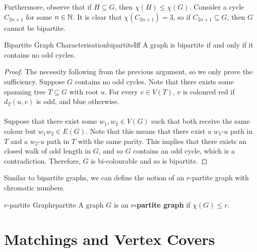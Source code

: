 \documentclass[math, code]{amznotes}
\theoremstyle{remark}
\begin{document}
Furthermore, observe that if $H \subseteq G$, then $\chi(H) \leq \chi(G)$. Consider a cycle $C_{2n + 1}$ for some $n \in \mathbb{N}$. It is clear that $\chi(C_{2n + 1}) = 3$, so if $C_{2n + 1} \subseteq G$, then $G$ cannot be bipartite.
\begin{thmbox}{Bipartite Graph Characterisation}{bipartiteIff}
    A graph is bipartite if and only if it contains no odd cycles.
    \tcblower
    \begin{proof}
        The necessity following from the previous argument, so we only prove the sufficiency. Suppose $G$ contains no odd cycles. Note that there exists some spanning tree $T \subseteq G$ with root $u$. For every $v \in V(T)$, $v$ is coloured red if $d_T(u, v)$ is odd, and blue otherwise.
        \\\\
        Suppose that there exist some $w_1, w_2 \in V(G)$ such that both receive the same colour but $w_1w_2 \in E(G)$. Note that this means that there exist a $w_1$-$u$ path in $T$ and a $w_2$-$u$ path in $T$ with the same parity. This implies that there exists an closed walk of odd length in $G$, and so $G$ contains an odd cycle, which is a contradiction. Therefore, $G$ is bi-colourable and so is bipartite.
    \end{proof}
\end{thmbox}
Similar to bipartite graphs, we can define the notion of an $r$-partite graph with chromatic numbers.
\begin{dfnbox}{$r$-partite Graph}{rpartite}
    A graph $G$ is an {\color{red} \textbf{$r$-partite graph}} if $\chi(G) \leq r$.
\end{dfnbox}

\chapter{Matchings and Vertex Covers}
\end{document}
